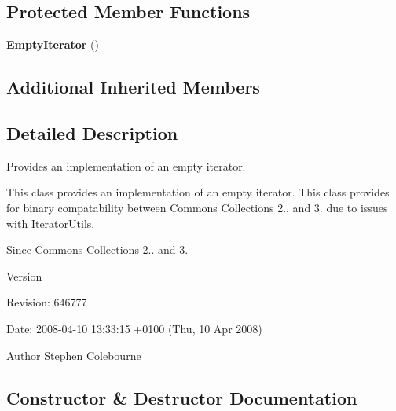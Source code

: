 \subsection*{Protected Member Functions}
\begin{DoxyCompactItemize}
\item 
{\bf Empty\-Iterator} ()
\end{DoxyCompactItemize}
\subsection*{Additional Inherited Members}


\subsection{Detailed Description}
Provides an implementation of an empty iterator. 

This class provides an implementation of an empty iterator. This class provides for binary compatability between Commons Collections 2.. and 3. due to issues with {\ttfamily Iterator\-Utils}.

\begin{DoxySince}{Since}
Commons Collections 2.. and 3. 
\end{DoxySince}
\begin{DoxyVersion}{Version}

\end{DoxyVersion}
\begin{DoxyParagraph}{Revision\-:}
646777 
\end{DoxyParagraph}
\begin{DoxyParagraph}{Date\-:}
2008-\/04-\/10 13\-:33\-:15 +0100 (Thu, 10 Apr 2008) 
\end{DoxyParagraph}


\begin{DoxyAuthor}{Author}
Stephen Colebourne 
\end{DoxyAuthor}


\subsection{Constructor \& Destructor Documentation}
